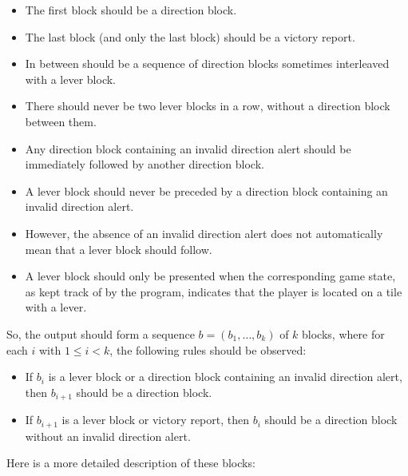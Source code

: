 \begin{itemize}
    \item
    The first block should be a direction block.
    \item
    The last block (and only the last block) should be a victory report.
    \item
    In between should be a sequence of direction blocks
    sometimes interleaved with a lever block.
    \item
    There should never be two lever blocks in a row,
    without a direction block between them.
    \item
    Any direction block containing an invalid direction alert
    should be immediately followed by another direction block.
    \item
    A lever block should never be preceded by
    a direction block containing an invalid direction alert.
    \item
    However, the absence of an invalid direction alert
    does not automatically mean that a lever block should follow.
    \item
    A lever block should only be presented
    when the corresponding game state,
    as kept track of by the program,
    indicates that the player is located
    on a tile with a lever.
\end{itemize}
So, the output should form a sequence $b = (b_1, \dots, b_k)$ of $k$ blocks,
where for each $i$ with $1 \le i < k$, the following rules should be observed:
\begin{itemize}
    \item
    If $b_i$ is a lever block or a direction block containing an invalid direction alert,
    then $b_{i+1}$ should be a direction block.
    \item
    If $b_{i+1}$ is a lever block or victory report,
    then $b_i$ should be a direction block without an invalid direction alert.
\end{itemize}
Here is a more detailed description of these blocks:
